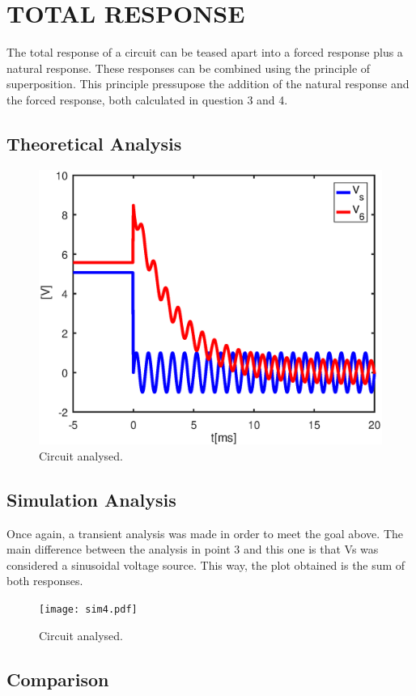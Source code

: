\section{TOTAL RESPONSE}

The total response of a circuit can be teased apart into a forced response plus a natural response. These responses can be combined using the principle of superposition. This principle pressupose the addition of the natural response and the forced response, both calculated in question 3 and 4.

\subsection{Theoretical Analysis}

\begin{figure}[h] \centering
\includegraphics[width=0.5\linewidth]{part4.eps}
\caption{Circuit analysed.}
\label{fig:sim4}
\end{figure}


\subsection{Simulation Analysis}
Once again, a transient analysis was made in order to meet the goal above. The main difference between the analysis in point 3 and this one is that Vs was considered a sinusoidal voltage source. This way, the plot obtained is the sum of both responses.

\begin{figure}[h] \centering
\texttt{[image: sim4.pdf]}
\caption{Circuit analysed.}
\label{fig:sim4}
\end{figure}

\subsection{Comparison}
\newpage
